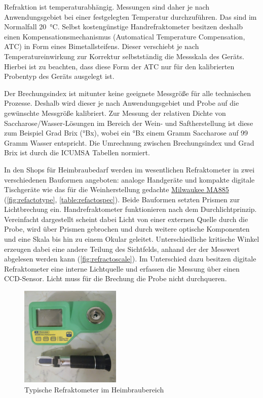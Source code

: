 \documentclass[a4paper,parskip=half]{scrartcl}
\begin{document}
Refraktion ist temperaturabhängig. Messungen sind daher je nach
Anwendungsgebiet bei einer festgelegten Temperatur durchzuführen.
Das sind im Normalfall 20~°C. Selbst kostengünstige Handrefraktometer
besitzen deshalb einen Kompensationsmechanismus (Automatical Temperature
Compensation, ATC) in Form eines Bimetallsteifens. Dieser 
verschiebt je nach Temperatureinwirkung zur Korrektur selbstständig
die Messskala des Geräts. Hierbei ist zu beachten, dass diese Form der
ATC nur für den kalibrierten Probentyp des Geräts ausgelegt ist.
\autocite{Depalma2017,Distillique2020,Gossett2012,Terrill2013}

Der Brechungsindex ist mitunter keine geeignete Messgröße für alle
technischen Prozesse. Deshalb wird dieser je nach Anwendungsgebiet
und Probe auf die gewünschte Messgröße kalibriert. Zur Messung
der relativen Dichte von Saccharose/Wasser-Lösungen im Bereich der
Wein- und Saftherstellung ist diese zum Beispiel Grad Brix (°Bx), wobei
ein °Bx einem Gramm Saccharose auf 99 Gramm Wasser entspricht. Die
Umrechnung zwischen Brechungsindex und Grad Brix ist durch die ICUMSA
Tabellen normiert.
\autocite{Bonham2001,Terrill2013}

In den Shops für Heimbraubedarf werden im wesentlichen Refraktometer in
zwei verschiedenen Bauformen angeboten: analoge Handgeräte
und kompakte digitale Tischgeräte wie das für die Weinherstellung
gedachte \href{https://milwaukeeinstruments.eu/milwaukee-ma885-digital-brix-oechsle-oe-and-kmw-babo-refractometer/}{Milwaukee MA885} (\autoref{fig:refactotype},
\autoref{table:refactospec}). Beide Bauformen setzten Prismen zur
Lichtbrechung ein. Handrefraktometer funktionieren
nach dem Durchlichtprinzip. Vereinfacht dargestellt scheint dabei Licht
von einer externen Quelle durch die Probe, wird über Prismen gebrochen
und durch weitere optische Komponenten und eine Skala bis hin zu einem
Okular geleitet. Unterschiedliche kritische Winkel erzeugen dabei eine
andere Teilung des Sichtfelds, anhand der der Messwert abgelesen werden
kann (\autoref{fig:refractoscale}). Im Unterschied dazu besitzen
digitale Refraktometer eine interne Lichtquelle und erfassen die
Messung über einen CCD-Sensor. Licht muss für die Brechung die Probe
nicht durchqueren. \autocite{AKRSSOGH2021,Gamer1959,Terrill2013}
 
\begin{figure}[h]
\centering
\includegraphics[width=4.8cm]{images/types.jpg}
\caption{Typische Refraktometer im Heimbraubereich}
\label{fig:refactotype}
\end{figure}
\end{document}
